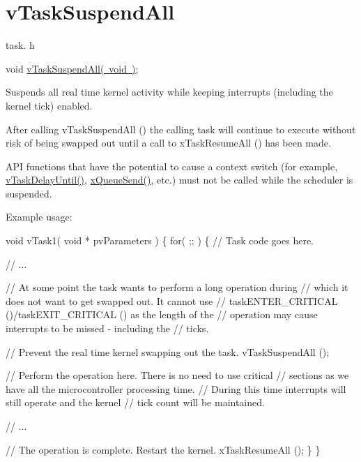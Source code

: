 \hypertarget{group__v_task_suspend_all}{}\section{v\+Task\+Suspend\+All}
\label{group__v_task_suspend_all}
task. h 
\begin{DoxyPre}void \mbox{\hyperlink{task_8h_a366b302eba79d10b5ee2a3756f0fcc43}{vTaskSuspendAll( void )}};\end{DoxyPre}


Suspends all real time kernel activity while keeping interrupts (including the kernel tick) enabled.

After calling v\+Task\+Suspend\+All () the calling task will continue to execute without risk of being swapped out until a call to x\+Task\+Resume\+All () has been made.

A\+PI functions that have the potential to cause a context switch (for example, \mbox{\hyperlink{task_8h_a3033ef5b1abc8618ea205d1082b21bb6}{v\+Task\+Delay\+Until()}}, \mbox{\hyperlink{queue_8h_af7eb49d3249351176992950d9185abe9}{x\+Queue\+Send()}}, etc.) must not be called while the scheduler is suspended.

Example usage\+: 
\begin{DoxyPre}
void vTask1( void * pvParameters )
\{
    for( ;; )
    \{
     // Task code goes here.\end{DoxyPre}



\begin{DoxyPre}     // ...\end{DoxyPre}



\begin{DoxyPre}     // At some point the task wants to perform a long operation during
     // which it does not want to get swapped out.  It cannot use
     // taskENTER\_CRITICAL ()/taskEXIT\_CRITICAL () as the length of the
     // operation may cause interrupts to be missed - including the
     // ticks.\end{DoxyPre}



\begin{DoxyPre}     // Prevent the real time kernel swapping out the task.
     vTaskSuspendAll ();\end{DoxyPre}



\begin{DoxyPre}     // Perform the operation here.  There is no need to use critical
     // sections as we have all the microcontroller processing time.
     // During this time interrupts will still operate and the kernel
     // tick count will be maintained.\end{DoxyPre}



\begin{DoxyPre}     // ...\end{DoxyPre}



\begin{DoxyPre}     // The operation is complete.  Restart the kernel.
     xTaskResumeAll ();
    \}
\}
  \end{DoxyPre}
 